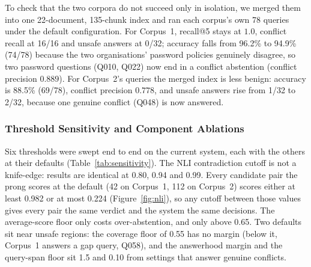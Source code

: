 \documentclass[conference]{IEEEtran}
\begin{document}
To check that the two corpora do not succeed only in isolation, we merged
them into one 22-document, 135-chunk index and ran each corpus's own 78
queries under the default configuration. For Corpus~1, recall@5 stays at
$1.0$, conflict recall at 16/16 and unsafe answers at 0/32; accuracy falls
from 96.2\% to 94.9\% (74/78) because the two organisations' password
policies genuinely disagree, so two password questions (Q010, Q022) now end
in a conflict abstention (conflict precision $0.889$). For Corpus~2's
queries the merged index is less benign: accuracy is 88.5\% (69/78),
conflict precision $0.778$, and unsafe answers rise from 1/32 to 2/32,
because one genuine conflict (Q048) is now answered.

\subsubsection{Threshold Sensitivity and Component Ablations}
\label{sec:sensitivity}

Six thresholds were swept end to end on the current system, each with the
others at their defaults (Table~\ref{tab:sensitivity}). The NLI
contradiction cutoff is not a knife-edge: results are identical at 0.80,
0.94 and 0.99. Every candidate pair the prong scores at the default (42 on
Corpus~1, 112 on Corpus~2) scores either at least 0.982 or at most 0.224
(Figure~\ref{fig:nli}), so any cutoff between those values gives every pair
the same verdict and the system the same decisions. The average-score floor only costs
over-abstention, and only above 0.65. Two defaults sit near unsafe regions:
the coverage floor of 0.55 has no margin (below it, Corpus~1 answers a gap
query, Q058), and the answerhood margin and the query-span floor sit 1.5
and 0.10 from settings that answer genuine conflicts.
\end{document}
